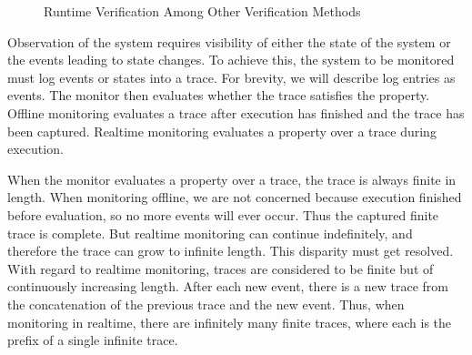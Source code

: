 \begin{figure}[h!]
	\caption{Runtime Verification Among Other Verification Methods}
	\label{fig:VerificationTechniqueTree}
\end{figure}

Observation of the system requires visibility of either the state of the system or the events leading to state changes.  To achieve this, the system to be monitored must log events or states into a trace.  For brevity, we will describe log entries as events.  The monitor then evaluates whether the trace satisfies the property.  Offline monitoring evaluates a trace after execution has finished and the trace has been captured.  Realtime monitoring evaluates a property over a trace during execution.


When the monitor evaluates a property over a trace, the trace is always finite in length.  When monitoring offline, we are not concerned because execution finished before evaluation, so no more events will ever occur.  Thus the captured finite trace is complete.  But realtime monitoring can continue indefinitely, and therefore the trace can grow to infinite length.   This disparity must get resolved.  With regard to realtime monitoring, traces are considered to be finite but of continuously increasing length.  After each new event, there is a new trace from the concatenation of the previous trace and the new event.  Thus, when monitoring in realtime, there are infinitely many finite traces, where each is the prefix of a single infinite trace.

